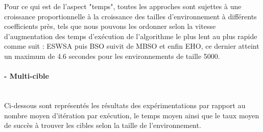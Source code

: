 	Pour ce qui est de l'aspect "temps", toutes les approches sont sujettes à une croissance proportionnelle à la croissance des tailles d'environnement à différents coefficients près, tels que nous pouvons les ordonner selon la vitesse d'augmentation des temps d'exécution de l'algorithme le plus lent au plus rapide comme suit : ESWSA puis BSO suivit de MBSO et enfin EHO, ce dernier atteint un maximum de 4.6 secondes pour les environnements de taille 5000.
	



\hspace{-0.5cm}
\begin{minipage}[t]{0.55\textwidth}
	\captionsetup{width=0.8\linewidth}
	\centering{}
	\label{IS1}
\end{minipage}\hfill
\hspace{-0.5cm}
\begin{minipage}[t]{0.55\textwidth}
	\captionsetup{width=0.8\linewidth}
	\centering{}
	\label{tS1}
\end{minipage}\hfill






\paragraph{- Multi-cible}
\textbf{ }\\
Ci-dessous sont représentés les résultats des expérimentations par rapport au nombre moyen d'itération par exécution, le temps moyen ainsi que le taux moyen de succès à trouver les cibles selon la taille de l'environnement.

